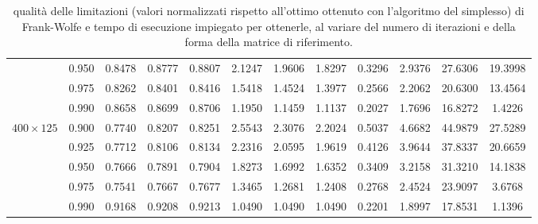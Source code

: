 \begin{landscape}
\begin{table}[!h]
\begin{tabularx}{641.68651pt}{cccccccccccc}
        & 0.950 & 0.8478 & 0.8777 & 0.8807 & 2.1247 & 1.9606 & 1.8297 & 0.3296 & 2.9376 & 27.6306 & 19.3998 \\
        & 0.975 & 0.8262 & 0.8401 & 0.8416 & 1.5418 & 1.4524 & 1.3977 & 0.2566 & 2.2062 & 20.6300 & 13.4564 \\
        & 0.990 & 0.8658 & 0.8699 & 0.8706 & 1.1950 & 1.1459 & 1.1137 & 0.2027 & 1.7696 & 16.8272 & 1.4226 \\
        \midrule
        \( 400\times 125 \)
        & 0.900 & 0.7740 & 0.8207 & 0.8251 & 2.5543 & 2.3076 & 2.2024 & 0.5037 & 4.6682 & 44.9879 & 27.5289 \\
        & 0.925 & 0.7712 & 0.8106 & 0.8134 & 2.2316 & 2.0595 & 1.9619 & 0.4126 & 3.9644 & 37.8337 & 20.6659 \\
        & 0.950 & 0.7666 & 0.7891 & 0.7904 & 1.8273 & 1.6992 & 1.6352 & 0.3409 & 3.2158 & 31.3210 & 14.1838 \\
        & 0.975 & 0.7541 & 0.7667 & 0.7677 & 1.3465 & 1.2681 & 1.2408 & 0.2768 & 2.4524 & 23.9097 & 3.6768 \\
        & 0.990 & 0.9168 & 0.9208 & 0.9213 & 1.0490 & 1.0490 & 1.0490 & 0.2201 & 1.8997 & 17.8531 & 1.1396 \\
        \bottomrule
    \end{tabularx}
    \caption{qualità delle limitazioni (valori normalizzati rispetto all'ottimo ottenuto con l'algoritmo del simplesso)
    di Frank-Wolfe e tempo di esecuzione impiegato per ottenerle, al variare del numero di iterazioni e della forma
    della matrice di riferimento.}
    \label{table:hugetable2}
\end{table}
\end{landscape}

